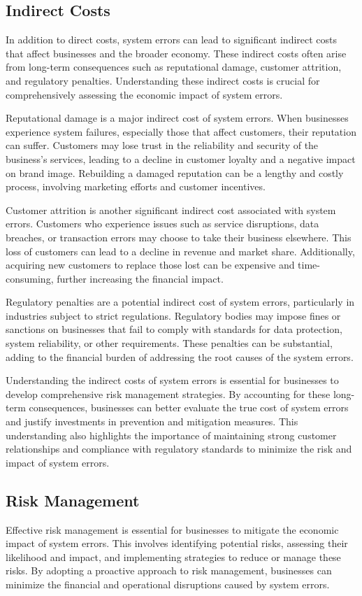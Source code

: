 \documentclass[10pt, conference, letterpaper]{IEEEtran}
\begin{document}
\subsection{Indirect Costs}
In addition to direct costs, system errors can lead to significant indirect costs that affect businesses and the broader economy. These indirect costs often arise from long-term consequences such as reputational damage, customer attrition, and regulatory penalties. Understanding these indirect costs is crucial for comprehensively assessing the economic impact of system errors.

Reputational damage is a major indirect cost of system errors. When businesses experience system failures, especially those that affect customers, their reputation can suffer. Customers may lose trust in the reliability and security of the business's services, leading to a decline in customer loyalty and a negative impact on brand image. Rebuilding a damaged reputation can be a lengthy and costly process, involving marketing efforts and customer incentives.

Customer attrition is another significant indirect cost associated with system errors. Customers who experience issues such as service disruptions, data breaches, or transaction errors may choose to take their business elsewhere. This loss of customers can lead to a decline in revenue and market share. Additionally, acquiring new customers to replace those lost can be expensive and time-consuming, further increasing the financial impact.

Regulatory penalties are a potential indirect cost of system errors, particularly in industries subject to strict regulations. Regulatory bodies may impose fines or sanctions on businesses that fail to comply with standards for data protection, system reliability, or other requirements. These penalties can be substantial, adding to the financial burden of addressing the root causes of the system errors.

Understanding the indirect costs of system errors is essential for businesses to develop comprehensive risk management strategies. By accounting for these long-term consequences, businesses can better evaluate the true cost of system errors and justify investments in prevention and mitigation measures. This understanding also highlights the importance of maintaining strong customer relationships and compliance with regulatory standards to minimize the risk and impact of system errors.

\subsection{Risk Management}
Effective risk management is essential for businesses to mitigate the economic impact of system errors. This involves identifying potential risks, assessing their likelihood and impact, and implementing strategies to reduce or manage these risks. By adopting a proactive approach to risk management, businesses can minimize the financial and operational disruptions caused by system errors.
\end{document}

